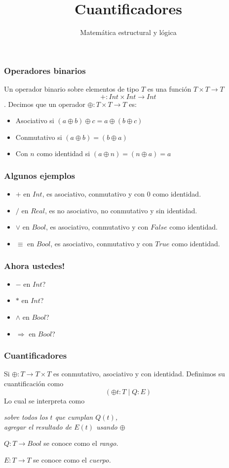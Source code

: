 \documentclass{beamer}
\title{Cuantificadores}
\author{Matemática estructural y lógica}
\institute{ISIS-1104}
\date{}
\newcommand{\then}{\Rightarrow}
\begin{document}
\frame{\titlepage}

\begin{frame}[fragile]
    \frametitle{Operadores binarios}
        Un operador binario sobre elementos de tipo $T$ es una función $T \times T \rightarrow T$
            $$+:Int \times Int \rightarrow Int$$.
        Decimos que un operador $\oplus:T \times T \rightarrow T$ es: 
        \begin{itemize}
            \item Asociativo si $(a \oplus b) \oplus c = a \oplus (b \oplus c)$
            \item Conmutativo si $(a \oplus b) = (b \oplus a)$
            \item Con $n$ como identidad si $(a \oplus n) = (n \oplus a) = a$
    \end{itemize}
\end{frame}

\begin{frame}[fragile]
    \frametitle{Algunos ejemplos}
    \begin{itemize}
        \item $+$ en $Int$, es asociativo, conmutativo y con $0$ como identidad.
        \item $/$ en $Real$, es no asociativo, no conmutativo y sin identidad.
        \item $\lor$ en $Bool$, es asociativo, conmutativo y con $False$ como identidad.
        \item $\equiv$ en $Bool$, es asociativo, conmutativo y con $True$ como identidad.
    \end{itemize}
\end{frame}

\begin{frame}[fragile]
    \frametitle{Ahora ustedes!}
    \begin{itemize}
        \item $-$ en $Int$?
        \item $*$ en $Int$?
        \item $\land$ en $Bool$?
        \item $\then$ en $Bool$?
    \end{itemize}
\end{frame}

\begin{frame}[fragile]
    \frametitle{Cuantificadores}
    Si $\oplus:T \rightarrow T \times T$ es conmutativo, asociativo y con identidad. Definimos su cuantificación como
        $$(\oplus t:T \mid Q:E)$$
    Lo cual se interpreta como
        \begin{center}
            \it{sobre todos los $t$ que cumplan $Q(t)$,\\ agregar el resultado de $E(t)$ usando $\oplus$}
        \end{center}
    $Q:T \rightarrow Bool$ se conoce como el \it rango.
    
    $E:T \rightarrow T$ se conoce como el \it cuerpo.
\end{frame}
\end{document}
